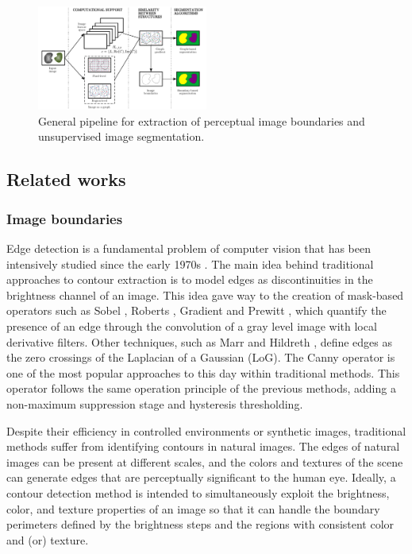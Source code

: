 \documentclass[journal]{IEEEtran}
\begin{document}
\begin{figure}[!ht]
	\centering
	\includegraphics[width=0.5\textwidth]{img_boundaries_segmentation_diagram}
	\caption{General pipeline for extraction of perceptual image boundaries and unsupervised image segmentation.}\label{fig:pipeline_gabor_image_segmentation}
\end{figure}

\subsection{Related works}

\subsubsection{Image boundaries}
Edge detection is a fundamental problem of computer vision that has been intensively studied since the early 1970s \cite{Hueckel:JACM:1971, Fram.Deutsch:TC:1975}. The main idea behind traditional approaches to contour extraction is to model edges as discontinuities in the brightness channel of an image. This idea gave way to the creation of mask-based operators such as Sobel \cite{Sobel.Feldman:SAIL:1990}, Roberts \cite{Roberts:Thesis:1963}, Gradient \cite{Maitre:Book:2003} and Prewitt \cite{Prewitt:PPP:1970}, which quantify the presence of an edge through the convolution of a gray level image with local derivative filters. Other techniques, such as Marr and Hildreth \cite{Marr.Hildreth:PRS:1980}, define edges as the zero crossings of the Laplacian of a Gaussian (LoG). The Canny operator \cite{Canny:PAMI:1986} is one of the most popular approaches to this day within traditional methods. This operator follows the same operation principle of the previous methods, adding a non-maximum suppression stage and hysteresis thresholding. 

Despite their efficiency in controlled environments or synthetic images, traditional methods suffer from identifying contours in natural images. The edges of natural images can be present at different scales, and the colors and textures of the scene can generate edges that are perceptually significant to the human eye. Ideally, a contour detection method is intended to simultaneously exploit the brightness, color, and texture properties of an image so that it can handle the boundary perimeters defined by the brightness steps and the regions with consistent color and (or) texture.
\end{document}
